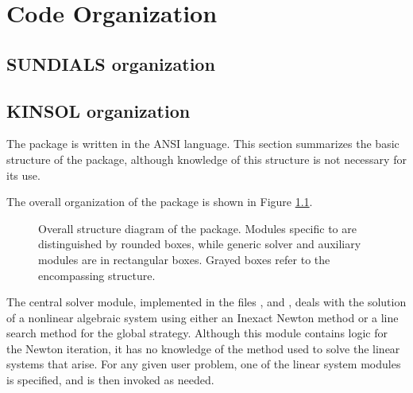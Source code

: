 \chapter{Code Organization}\label{s:organization}

\section{SUNDIALS organization}\label{ss:sun_org}


\section{KINSOL organization}\label{ss:kinsol_org}

The {\kinsol} package is written in the ANSI {\C} language. This section
summarizes the basic structure of the package, although knowledge
of this structure is not necessary for its use.

The overall organization of the {\kinsol} package is shown in Figure
\ref{f:kinorg}.
\begin{figure}
{\centerline{}}
\caption [Overall structure diagram of the KINSOL package]
{Overall structure diagram of the {\kinsol} package.
  Modules specific to {\kinsol} are distinguished by rounded boxes, while
  generic solver and auxiliary modules are in rectangular boxes.
  Grayed boxes refer to the encompassing {\sundials} structure.}
\label{f:kinorg}
\end{figure}
The central solver module, implemented in the files
,  and , deals with the solution
of a nonlinear algebraic system using either an Inexact Newton method or a
line search method for the global strategy. Although this module contains logic
for the Newton iteration, it has no knowledge of the method used to solve the
linear systems that arise. For any given user problem, one of the linear system
modules is specified, and is then invoked as needed.

